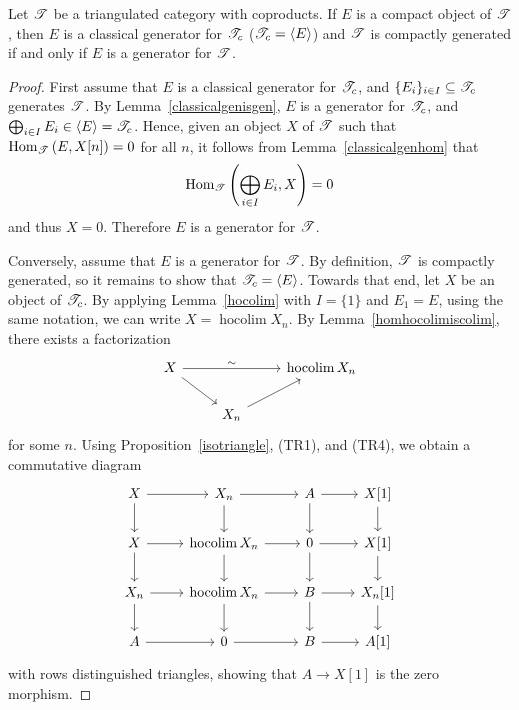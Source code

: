 \documentclass[dissertation.tex]{subfiles}
\begin{document}
\begin{prop}\label{GeneratorIFFClassicAndCompactlyGenerated}
  Let $\mathscr{T}$ be a triangulated category with coproducts.
  If $E$ is a compact object of $\mathscr{T}$, then
  $E$ is a classical generator for $\mathscr{T}_c$ ($\mathscr{T}_c = \langle E \rangle$) and $\mathscr{T}$ is compactly generated 
  if and only if
  $E$ is a generator for $\mathscr{T}$.
  
  \begin{proof}
    First assume that $E$ is a classical generator for $\mathscr{T}_c$, and $\{E_i\}_{i \in I} \subseteq \mathscr{T}_c$ generates $\mathscr{T}$.
    By Lemma~\ref{classicalgenisgen}, $E$ is a generator for $\mathscr{T}_c$, and $\bigoplus_{i \in I}E_i \in \langle E \rangle = \mathscr{T}_c$.
    Hence, given an object $X$ of $\mathscr{T}$ such that $\operatorname{Hom}_{\mathscr{T}}\left(E,X[n]\right) = 0$ for all $n$, it follows from Lemma~\ref{classicalgenhom} that
    $$\operatorname{Hom}_{\mathscr{T}}\left(\bigoplus_{i \in I}E_i, X\right) = 0$$
    and thus $X = 0$.
    Therefore $E$ is a generator for $\mathscr{T}$.
    
    Conversely, assume that $E$ is a generator for $\mathscr{T}$.
    By definition, $\mathscr{T}$ is compactly generated, so it remains to show that $\mathscr{T}_c = \langle E \rangle$.
    Towards that end, let $X$ be an object of $\mathscr{T}_c$.
    By applying Lemma~\ref{hocolim} with $I = \{1\}$ and $E_1 = E$, using the same notation, we can write $X = \operatorname{hocolim}X_n$.
    By Lemma~\ref{homhocolimiscolim}, there exists a factorization
    $$\begin{tikzcd}
      X \arrow{rd}\arrow{rr}{\sim} & & \operatorname{hocolim} X_n\\
      & X_n\arrow{ur}
    \end{tikzcd}$$
    for some $n$.
    Using Proposition~\ref{isotriangle}, (TR1), and (TR4), we obtain a commutative diagram 
    $$\begin{tikzcd}
      X \arrow{r}\arrow{d} & X_n \arrow{r}\arrow{d} & A \arrow{d}\arrow{r} & X[1]\arrow{d}\\
      X \arrow{d}\arrow{r} & \operatorname{hocolim}X_n \arrow{d}\arrow{r} & 0 \arrow{d}\arrow{r} & X[1]\arrow{d}\\
      X_n \arrow{d}\arrow{r} & \operatorname{hocolim}X_n \arrow{d}\arrow{r} & B \arrow{r}\arrow{d} & X_n[1]\arrow{d}\\
      A \arrow{r} & 0 \arrow{r} & B \arrow{r} & A[1]
    \end{tikzcd}$$
    with rows distinguished triangles, showing that $A \rightarrow X[1]$ is the zero morphism.
    

\end{proof}
\end{prop}
\end{document}
